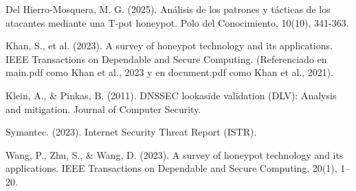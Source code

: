 Del Hierro-Mosquera, M. G. (2025). Análisis de los patrones y tácticas de los atacantes mediante una T-pot honeypot. Polo del Conocimiento, 10(10), 341-363. 

Khan, S., et al. (2023). A survey of honeypot technology and its applications. IEEE Transactions on Dependable and Secure Computing. (Referenciado en main.pdf como Khan et al., 2023 y en document.pdf como Khan et al., 2021). 

Klein, A., \& Pinkas, B. (2011). DNSSEC lookaside validation (DLV): Analysis and mitigation. Journal of Computer Security. 

Symantec. (2023). Internet Security Threat Report (ISTR). 

Wang, P., Zhu, S., \& Wang, D. (2023). A survey of honeypot technology and its applications. IEEE Transactions on Dependable and Secure Computing, 20(1), 1–20.